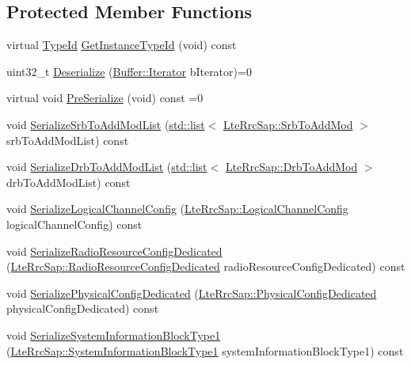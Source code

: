 \subsection*{Protected Member Functions}
\begin{DoxyCompactItemize}
\item 
virtual \hyperlink{classns3_1_1TypeId}{Type\+Id} \hyperlink{classns3_1_1RrcAsn1Header_a522e423615b750e76e109c8003452b5e}{Get\+Instance\+Type\+Id} (void) const 
\item 
uint32\+\_\+t \hyperlink{classns3_1_1RrcAsn1Header_afbb8ee5709d02eca06349cd26052108a}{Deserialize} (\hyperlink{classns3_1_1Buffer_1_1Iterator}{Buffer\+::\+Iterator} b\+Iterator)=0
\item 
virtual void \hyperlink{classns3_1_1RrcAsn1Header_a4ae9d9c61fb27223e3ed4360d4344893}{Pre\+Serialize} (void) const =0
\item 
void \hyperlink{classns3_1_1RrcAsn1Header_ad0c889ae1863b620e86026db7d217c75}{Serialize\+Srb\+To\+Add\+Mod\+List} (\hyperlink{openflow-interface_8h_afd9bcfa176617760671b67580f536fa7}{std\+::list}$<$ \hyperlink{structns3_1_1LteRrcSap_1_1SrbToAddMod}{Lte\+Rrc\+Sap\+::\+Srb\+To\+Add\+Mod} $>$ srb\+To\+Add\+Mod\+List) const 
\item 
void \hyperlink{classns3_1_1RrcAsn1Header_ae227535eb179f1fc87b500225a5893ef}{Serialize\+Drb\+To\+Add\+Mod\+List} (\hyperlink{openflow-interface_8h_afd9bcfa176617760671b67580f536fa7}{std\+::list}$<$ \hyperlink{structns3_1_1LteRrcSap_1_1DrbToAddMod}{Lte\+Rrc\+Sap\+::\+Drb\+To\+Add\+Mod} $>$ drb\+To\+Add\+Mod\+List) const 
\item 
void \hyperlink{classns3_1_1RrcAsn1Header_a3e43cd3672501a6c4118405157fdeb79}{Serialize\+Logical\+Channel\+Config} (\hyperlink{structns3_1_1LteRrcSap_1_1LogicalChannelConfig}{Lte\+Rrc\+Sap\+::\+Logical\+Channel\+Config} logical\+Channel\+Config) const 
\item 
void \hyperlink{classns3_1_1RrcAsn1Header_a21940b59764c933864f631482a6e4af0}{Serialize\+Radio\+Resource\+Config\+Dedicated} (\hyperlink{structns3_1_1LteRrcSap_1_1RadioResourceConfigDedicated}{Lte\+Rrc\+Sap\+::\+Radio\+Resource\+Config\+Dedicated} radio\+Resource\+Config\+Dedicated) const 
\item 
void \hyperlink{classns3_1_1RrcAsn1Header_a7543693686024fa6f694168cbee7110b}{Serialize\+Physical\+Config\+Dedicated} (\hyperlink{structns3_1_1LteRrcSap_1_1PhysicalConfigDedicated}{Lte\+Rrc\+Sap\+::\+Physical\+Config\+Dedicated} physical\+Config\+Dedicated) const 
\item 
void \hyperlink{classns3_1_1RrcAsn1Header_ac2da5b78bf99520a9ef23a796ce89008}{Serialize\+System\+Information\+Block\+Type1} (\hyperlink{structns3_1_1LteRrcSap_1_1SystemInformationBlockType1}{Lte\+Rrc\+Sap\+::\+System\+Information\+Block\+Type1} system\+Information\+Block\+Type1) const 

\end{DoxyCompactItemize}
